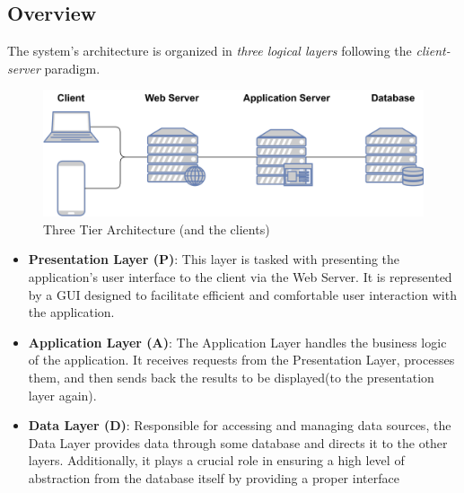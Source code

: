 \documentclass[../DD.tex]{subfiles}
\begin{document}
    \subsection{Overview}\label{subsec:overview}
    The system's architecture is organized in \textit{three logical layers} following the \textit{client-server} paradigm.
    \begin{figure}[H]
        \centering
        \includegraphics[width=\textwidth]{../assets/section_2/3-tier-architecture.png}
        \caption{Three Tier Architecture (and the clients)}
        \label{fig:3_tier_architecture}
    \end{figure}
    \begin{itemize}
        \item {\textbf{Presentation Layer (P)}: This layer is tasked with presenting the application's user interface to the client via the Web Server. 
        It is represented by a GUI designed to facilitate efficient and comfortable user interaction with the application.}
        \item {\textbf{Application Layer (A)}: The Application Layer handles the business logic of the application. 
        It receives requests from the Presentation Layer, processes them, and then sends back the results to be displayed(to the presentation layer again).}
        \item {\textbf{Data Layer (D)}: Responsible for accessing and managing data sources, the Data Layer provides data through some database and directs it to the other layers. 
        Additionally, it plays a crucial role in ensuring a high level of abstraction from the database itself by providing a proper interface}
    \end{itemize}
\end{document}
